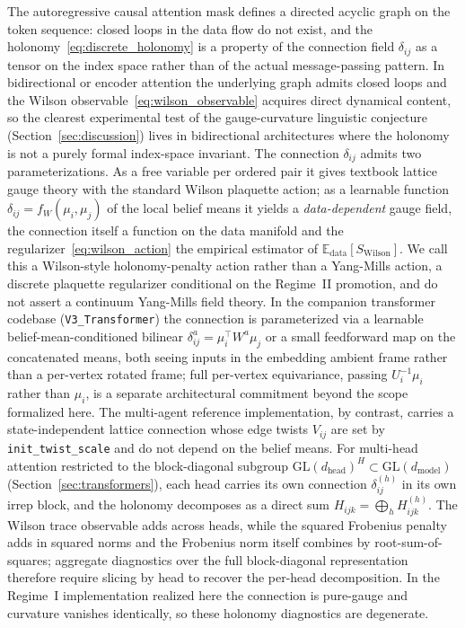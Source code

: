 \documentclass[11pt]{article}
\begin{document}
The autoregressive causal attention mask defines a directed acyclic graph on the token sequence: closed loops in the data flow do not exist, and the holonomy~\eqref{eq:discrete_holonomy} is a property of the connection field $\delta_{ij}$ as a tensor on the index space rather than of the actual message-passing pattern. In bidirectional or encoder attention the underlying graph admits closed loops and the Wilson observable~\eqref{eq:wilson_observable} acquires direct dynamical content, so the clearest experimental test of the gauge-curvature linguistic conjecture (Section~\ref{sec:discussion}) lives in bidirectional architectures where the holonomy is not a purely formal index-space invariant. The connection $\delta_{ij}$ admits two parameterizations. As a free variable per ordered pair it gives textbook lattice gauge theory with the standard Wilson plaquette action; as a learnable function $\delta_{ij} = f_W(\mu_i, \mu_j)$ of the local belief means it yields a \emph{data-dependent} gauge field, the connection itself a function on the data manifold and the regularizer~\eqref{eq:wilson_action} the empirical estimator of $\mathbb{E}_{\mathrm{data}}[S_{\mathrm{Wilson}}]$. We call this a Wilson-style holonomy-penalty action rather than a Yang-Mills action, a discrete plaquette regularizer conditional on the Regime~II promotion, and do not assert a continuum Yang-Mills field theory. In the companion transformer codebase (\texttt{V3\_Transformer}) the connection is parameterized via a learnable belief-mean-conditioned bilinear $\delta_{ij}^a = \mu_i^\top W^a \mu_j$ or a small feedforward map on the concatenated means, both seeing inputs in the embedding ambient frame rather than a per-vertex rotated frame; full per-vertex equivariance, passing $U_i^{-1}\mu_i$ rather than $\mu_i$, is a separate architectural commitment beyond the scope formalized here. The multi-agent reference implementation, by contrast, carries a state-independent lattice connection whose edge twists $V_{ij}$ are set by \texttt{init\_twist\_scale} and do not depend on the belief means. For multi-head attention restricted to the block-diagonal subgroup $\mathrm{GL}(d_{\mathrm{head}})^H \subset \mathrm{GL}(d_{\mathrm{model}})$ (Section~\ref{sec:transformers}), each head carries its own connection $\delta_{ij}^{(h)}$ in its own irrep block, and the holonomy decomposes as a direct sum $H_{ijk} = \bigoplus_h H_{ijk}^{(h)}$. The Wilson trace observable adds across heads, while the squared Frobenius penalty adds in squared norms and the Frobenius norm itself combines by root-sum-of-squares; aggregate diagnostics over the full block-diagonal representation therefore require slicing by head to recover the per-head decomposition. In the Regime~I implementation realized here the connection is pure-gauge and curvature vanishes identically, so these holonomy diagnostics are degenerate.
\end{document}
